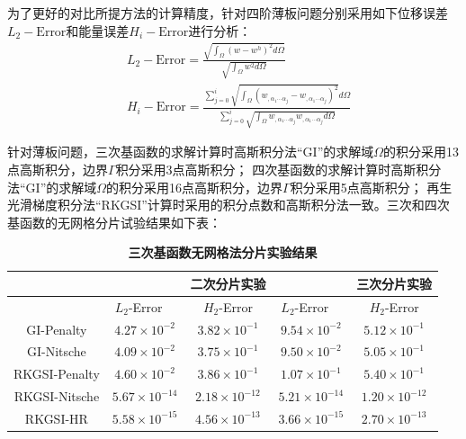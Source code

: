 为了更好的对比所提方法的计算精度，针对四阶薄板问题分别采用如下位移误差$L_2-\text{Error}$和能量误差$H_i-\text{Error}$进行分析：
\begin{equation}
\begin{split}
    &L_2-\text{Error}=\frac{\sqrt{\int_{\Omega}(w-w^h)^2d\Omega}}{\sqrt{\int_{\Omega}w^2d\Omega}}\\
    &H_i-\text{Error}=\frac{\sum_{j=0}^{i}\sqrt{\int_{\Omega}(w_{,\alpha_1\dotsb \alpha_j}-w_{,\alpha_1\dotsb \alpha_j})^2}d\Omega}{\sum_{j=0}^{i}\sqrt{\int_{\Omega}w_{,\alpha_1\dotsb \alpha_j}w_{,\alpha_1\dotsb \alpha_j}d\Omega}}
\end{split}
\end{equation}\par
针对薄板问题，三次基函数的求解计算时高斯积分法“GI”的求解域$\Omega$的积分采用13点高斯积分，边界$\Gamma$积分采用3点高斯积分；
四次基函数的求解计算时高斯积分法“GI”的求解域$\Omega$的积分采用16点高斯积分，边界$\Gamma$积分采用5点高斯积分；
再生光滑梯度积分法“RKGSI”计算时采用的积分点数和高斯积分法一致。三次和四次基函数的无网格分片试验结果如下表：
\newpage
\begin{table}[H]
    \caption{\textbf{三次基函数无网格法分片实验结果}}
    \centering\label{cubic}
   \begin{tabular}{ccccc}
   \toprule
   &$\quad$ &二次分片实验 &$\quad$ &三次分片实验\\
   \midrule
   &$L_2$-Error$\quad$&$H_2$-Error&$L_2$-Error$\quad$&$H_2$-Error\\
   \midrule
   GI-Penalty&$4.27\times10^{-2}$&$3.82\times10^{-1}$&$9.54\times10^{-2}$&$5.12\times10^{-1}$\\
   GI-Nitsche&$4.09\times10^{-2}$&$3.75\times10^{-1}$&$9.50\times10^{-2}$&$5.05\times10^{-1}$\\
  RKGSI-Penalty&$4.60\times10^{-2}$&$3.86\times10^{-1}$&$1.07\times10^{-1}$&$5.40\times10^{-1}$\\
  RKGSI-Nitsche&$5.67\times10^{-14}$&$2.18\times10^{-12}$&$5.21\times10^{-14}$&$1.20\times10^{-12}$\\
  RKGSI-HR&$5.58\times10^{-15}$&$4.56\times10^{-13}$&$3.66\times10^{-15}$&$2.70\times10^{-13}$\\
   \bottomrule
   \end{tabular}
   \end{table}
